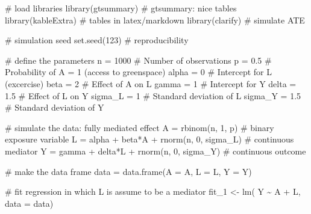 \documentclass[
  singlecolumn]{article}
\newenvironment{Shaded}{\begin{snugshade}}{\end{snugshade}}
\newcommand{\AttributeTok}[1]{\textcolor[rgb]{0.40,0.45,0.13}{#1}}
\newcommand{\CommentTok}[1]{\textcolor[rgb]{0.37,0.37,0.37}{#1}}
\newcommand{\DecValTok}[1]{\textcolor[rgb]{0.68,0.00,0.00}{#1}}
\newcommand{\FloatTok}[1]{\textcolor[rgb]{0.68,0.00,0.00}{#1}}
\newcommand{\FunctionTok}[1]{\textcolor[rgb]{0.28,0.35,0.67}{#1}}
\newcommand{\NormalTok}[1]{\textcolor[rgb]{0.00,0.23,0.31}{#1}}
\newcommand{\OtherTok}[1]{\textcolor[rgb]{0.00,0.23,0.31}{#1}}
\newcommand{\SpecialCharTok}[1]{\textcolor[rgb]{0.37,0.37,0.37}{#1}}
\begin{document}
\begin{Shaded}
\begin{Highlighting}[]
\CommentTok{\# load libraries}
\FunctionTok{library}\NormalTok{(gtsummary) }\CommentTok{\# gtsummary: nice tables}
\FunctionTok{library}\NormalTok{(kableExtra) }\CommentTok{\#  tables in latex/markdown}
\FunctionTok{library}\NormalTok{(clarify) }\CommentTok{\# simulate ATE}

\CommentTok{\# simulation seed}
\FunctionTok{set.seed}\NormalTok{(}\DecValTok{123}\NormalTok{) }\CommentTok{\#  reproducibility}

\CommentTok{\# define the parameters }
\NormalTok{n }\OtherTok{=} \DecValTok{1000} \CommentTok{\# Number of observations}
\NormalTok{p }\OtherTok{=} \FloatTok{0.5}  \CommentTok{\# Probability of A = 1 (access to greenspace)}
\NormalTok{alpha }\OtherTok{=} \DecValTok{0} \CommentTok{\# Intercept for L (excercise)}
\NormalTok{beta }\OtherTok{=} \DecValTok{2}  \CommentTok{\# Effect of A on L }
\NormalTok{gamma }\OtherTok{=} \DecValTok{1} \CommentTok{\# Intercept for Y }
\NormalTok{delta }\OtherTok{=} \FloatTok{1.5} \CommentTok{\# Effect of L on Y}
\NormalTok{sigma\_L }\OtherTok{=} \DecValTok{1} \CommentTok{\# Standard deviation of L}
\NormalTok{sigma\_Y }\OtherTok{=} \FloatTok{1.5} \CommentTok{\# Standard deviation of Y}

\CommentTok{\# simulate the data: fully mediated effect }
\NormalTok{A }\OtherTok{=} \FunctionTok{rbinom}\NormalTok{(n, }\DecValTok{1}\NormalTok{, p) }\CommentTok{\# binary exposure variable}
\NormalTok{L }\OtherTok{=}\NormalTok{ alpha }\SpecialCharTok{+}\NormalTok{ beta}\SpecialCharTok{*}\NormalTok{A }\SpecialCharTok{+} \FunctionTok{rnorm}\NormalTok{(n, }\DecValTok{0}\NormalTok{, sigma\_L) }\CommentTok{\# continuous mediator}
\NormalTok{Y }\OtherTok{=}\NormalTok{ gamma }\SpecialCharTok{+}\NormalTok{ delta}\SpecialCharTok{*}\NormalTok{L }\SpecialCharTok{+} \FunctionTok{rnorm}\NormalTok{(n, }\DecValTok{0}\NormalTok{, sigma\_Y) }\CommentTok{\# continuous outcome}

\CommentTok{\# make the data frame}
\NormalTok{data }\OtherTok{=} \FunctionTok{data.frame}\NormalTok{(}\AttributeTok{A =}\NormalTok{ A, }\AttributeTok{L =}\NormalTok{ L, }\AttributeTok{Y =}\NormalTok{ Y)}

\CommentTok{\# fit regression in which L is assume to be a mediator}
\NormalTok{fit\_1 }\OtherTok{\textless{}{-}} \FunctionTok{lm}\NormalTok{( Y }\SpecialCharTok{\textasciitilde{}}\NormalTok{ A }\SpecialCharTok{+}\NormalTok{ L, }\AttributeTok{data =}\NormalTok{ data)}


\end{Highlighting}
\end{Shaded}
\end{document}
